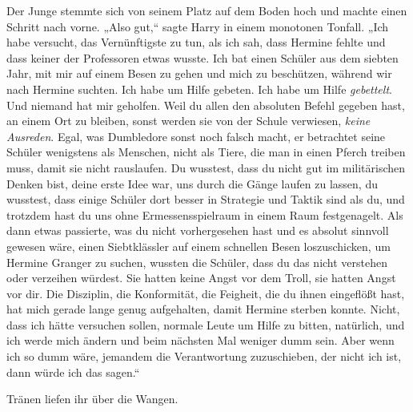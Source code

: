 Der Junge stemmte sich von seinem Platz auf dem Boden hoch und machte einen Schritt nach vorne. „Also gut,“ sagte Harry in einem monotonen Tonfall. „Ich habe versucht, das Vernünftigste zu tun, als ich sah, dass Hermine fehlte und dass keiner der Professoren etwas wusste. Ich bat einen Schüler aus dem siebten Jahr, mit mir auf einem Besen zu gehen und mich zu beschützen, während wir nach Hermine suchten. Ich habe um Hilfe gebeten. Ich habe um Hilfe \emph{gebettelt}. Und niemand hat mir geholfen. Weil du allen den absoluten Befehl gegeben hast, an einem Ort zu bleiben, sonst werden sie von der Schule verwiesen, \emph{keine Ausreden}. Egal, was Dumbledore sonst noch falsch macht, er betrachtet seine Schüler wenigstens als Menschen, nicht als Tiere, die man in einen Pferch treiben muss, damit sie nicht rauslaufen. Du wusstest, dass du nicht gut im militärischen Denken bist, deine erste Idee war, uns durch die Gänge laufen zu lassen, du wusstest, dass einige Schüler dort besser in Strategie und Taktik sind als du, und trotzdem hast du uns ohne Ermessensspielraum in einem Raum festgenagelt. Als dann etwas passierte, was du nicht vorhergesehen hast und es absolut sinnvoll gewesen wäre, einen Siebtklässler auf einem schnellen Besen loszuschicken, um Hermine Granger zu suchen, wussten die Schüler, dass du das nicht verstehen oder verzeihen würdest. Sie hatten keine Angst vor dem Troll, sie hatten Angst vor dir. Die Disziplin, die Konformität, die Feigheit, die du ihnen eingeflößt hast, hat mich gerade lange genug aufgehalten, damit Hermine sterben konnte. Nicht, dass ich hätte versuchen sollen, normale Leute um Hilfe zu bitten, natürlich, und ich werde mich ändern und beim nächsten Mal weniger dumm sein. Aber wenn ich so dumm wäre, jemandem die Verantwortung zuzuschieben, der nicht ich ist, dann würde ich das sagen.“

Tränen liefen ihr über die Wangen.

